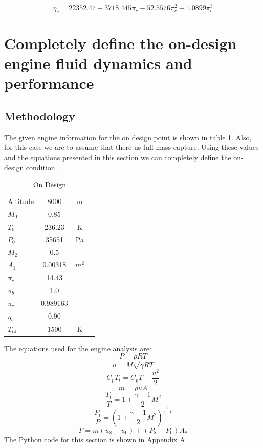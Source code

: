 \documentclass[journal ]{new-aiaa}
\begin{document}
\begin{equation}
    \eta_c = 
    22352.47 + 3718.445 \pi_c -52.5576 \pi_c^2 -1.0899 \pi_c^3
\end{equation} 

\pagebreak 

\section{Completely define the on-design engine fluid dynamics and performance}
\subsection{Methodology}
The given engine information for the on design point is shown in table \ref{tab:on_design}. 
Also, for this case we are to assume that there us full mass capture. 
Using these values and the equations presented in this section we can completely define the on-design condition.

\begin{table}[hbt!]
    \caption{\label{tab:on_design} On Design}
    \centering
    \begin{tabular}{lccc}
    \hline
    Altitude&   8000&       m\\
    $M_0$&      0.85&       \\
    $T_0$&      236.23&     K\\
    $P_0$&      35651&      Pa\\
    $M_2$&      0.5&        \\
    $A_1$&      0.00318&    $m^2$\\
    $\pi_c$&    14.43&      \\
    $\pi_b$&    1.0&        \\
    $\pi_c$&    0.989163&   \\
    $\eta_c$&   0.90&       \\
    $T_{t4}$&   1500&       K\\
    \hline
    \end{tabular}
    \end{table}  

\noindent The equations used for the engine analysis are:
\begin{equation}
    P = \rho R T
\end{equation} 
\begin{equation}
    u = M \sqrt{\gamma R T}
\end{equation} 
\begin{equation}
    C_p T_t = C_p T + \frac{u^2}{2}
\end{equation} 
\begin{equation}
    \dot{m} = \rho u A
\end{equation} 
\begin{equation}
    \frac{T_t}{T} = 1 + \frac{\gamma-1}{2} M^2
\end{equation} 
\begin{equation}
    \frac{P_t}{P} = \left(1 + \frac{\gamma-1}{2} M^2\right)^{\frac{\gamma}{\gamma-1}}
\end{equation} 
\begin{equation}
    F = \dot{m} \left(u_8 - u_0\right)+ \left(P_8 - P_0\right) A_8
\end{equation} 
The Python code for this section is shown in Appendix A
\end{document}
